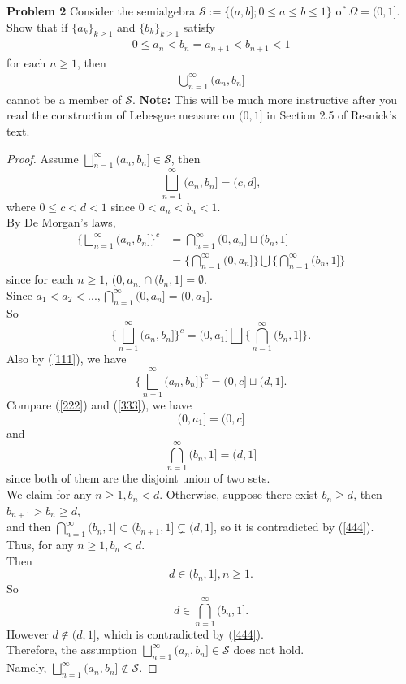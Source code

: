 \documentclass{article}
\newcommand{\lls}{\mathcal{S}}
\newcommand{\uu}{\bigsqcup_{n=1}^{\infty}(a_n,b_n]}
\begin{document}
\vspace{3 mm}

\noindent \textbf{Problem 2} Consider the semialgebra $\mathcal{S} := \{(a,b]; 0 \leq a \leq b \leq 1\}$ of $\Omega = (0,1]$.  Show that if $\{a_{k}\}_{k \geq 1}$ and $\{b_{k}\}_{k \geq 1}$ satisfy
\begin{eqnarray*} 0 \leq a_{n} < b_{n} = a_{n+1} < b_{n+1} < 1 \end{eqnarray*} for each $n \geq 1$, then
\begin{eqnarray*} \bigcup_{n=1}^{\infty}(a_{n}, b_{n}] \end{eqnarray*} cannot be a member of $\mathcal{S}$.  \textbf{Note:} This will be much more instructive after you read the construction of Lebesgue measure on $(0,1]$ in Section 2.5 of Resnick's text.

\begin{proof}
	Assume $\uu \in \lls$, then 
	\begin{equation} \label{111}
		\uu = (c,d],
	\end{equation}
		where $0 \leq c < d < 1$ since $0 < a_n < b_n < 1$.\\
		By De Morgan\rq s laws,
		\begin{align*}
	\Bigg\{ \uu \Bigg\} ^ c &= \bigcap_{n=1}^{\infty}(0, a_{n}] \sqcup (b_n,1] \\
					 	   &= \Bigg \{\bigcap_{n=1}^{\infty}(0, a_{n}] \Bigg \} \bigcup \Bigg\{\bigcap_{n=1}^{\infty}(b_n, 1]\Bigg\}	
		\end{align*}
		since for each $n \geq 1$, $(0,a_n] \cap (b_n,1] = \emptyset$.\\
		Since $a_1 < a_2 < ..., \bigcap_{n=1}^{\infty}(0, a_{n}] = (0, a_1]$. \\
		So 
		\begin{equation}\label{222}
		\Bigg\{ \uu \Bigg\} ^ c = (0,a_1] \bigsqcup \Bigg\{\bigcap_{n=1}^{\infty}(b_n, 1]\Bigg\}.
		\end{equation}
		Also by (\ref{111}), we have
		\begin{equation}\label{333}
			\Bigg\{ \uu \Bigg\} ^ c = (0,c] \sqcup (d,1].
		\end{equation}
		Compare (\ref{222}) and (\ref{333}), we have
			$$(0,a_1] = (0,c] $$
			and 
		\begin{equation}\label{444} 
			\bigcap_{n=1}^{\infty}(b_n, 1] = (d,1] 
		\end{equation}
		since both of them are the disjoint union of two sets.\\
		We claim for any $n \geq 1, b_n < d$. Otherwise, suppose there exist $b_n \geq d$, then $b_{n+1} > b_n \geq d$,\\
		and then $\bigcap_{n=1}^{\infty}(b_n, 1] \subset (b_{n+1},1] \subsetneq (d,1]$, so it is contradicted by (\ref{444}).	\\
		Thus, for any $n \geq 1, b_n < d$.\\
		Then 
			$$d \in (b_n, 1], n \geq 1.$$
		So 
		$$ d \in \bigcap_{n=1}^{\infty}(b_n, 1].$$
	However $d \not\in (d,1]$, which is contradicted by (\ref{444}).\\
	Therefore, the assumption $\uu \in \lls$ does not hold.\\
	Namely, $\uu \not\in \lls$.

		
	

\end{proof}
\end{document}
